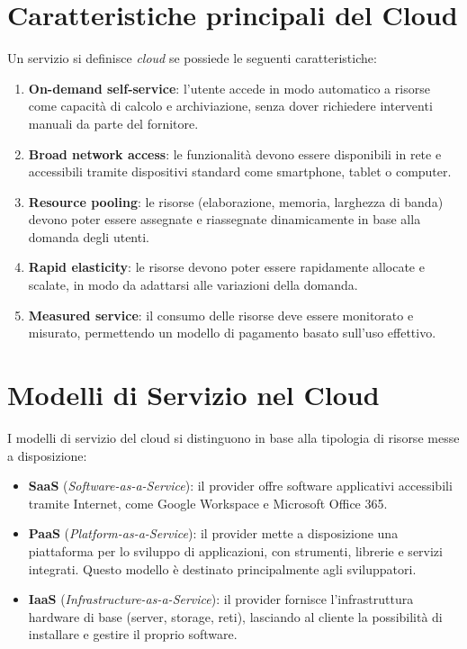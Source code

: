 \documentclass[12pt]{report}
\begin{document}
	\section{Caratteristiche principali del Cloud}
	Un servizio si definisce \textit{cloud} se possiede le seguenti caratteristiche:
	\begin{enumerate}
		\item \textbf{On-demand self-service}: l'utente accede in modo automatico a risorse come capacità di calcolo e archiviazione, senza dover richiedere interventi manuali da parte del fornitore.
		\item \textbf{Broad network access}: le funzionalità devono essere disponibili in rete e accessibili tramite dispositivi standard come smartphone, tablet o computer.
		\item \textbf{Resource pooling}: le risorse (elaborazione, memoria, larghezza di banda) devono poter essere assegnate e riassegnate dinamicamente in base alla domanda degli utenti.
		\item \textbf{Rapid elasticity}: le risorse devono poter essere rapidamente allocate e scalate, in modo da adattarsi alle variazioni della domanda.
		\item \textbf{Measured service}: il consumo delle risorse deve essere monitorato e misurato, permettendo un modello di pagamento basato sull'uso effettivo.
	\end{enumerate}

	\section{Modelli di Servizio nel Cloud}
	I modelli di servizio del cloud si distinguono in base alla tipologia di risorse messe a disposizione:
	\begin{itemize}
		\item \textbf{SaaS} (\textit{Software-as-a-Service}): il provider offre software applicativi accessibili tramite Internet, come Google Workspace e Microsoft Office 365.
		\item \textbf{PaaS} (\textit{Platform-as-a-Service}): il provider mette a disposizione una piattaforma per lo sviluppo di applicazioni, con strumenti, librerie e servizi integrati. Questo modello è destinato principalmente agli sviluppatori.
		\item \textbf{IaaS} (\textit{Infrastructure-as-a-Service}): il provider fornisce l’infrastruttura hardware di base (server, storage, reti), lasciando al cliente la possibilità di installare e gestire il proprio software.
	\end{itemize}
\end{document}
